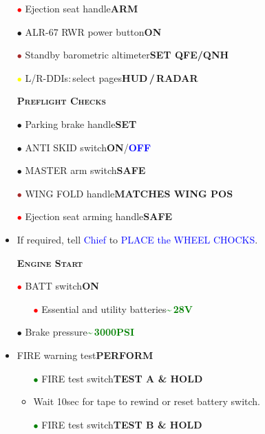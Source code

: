 \documentclass[a4paper,12pt,dvipsnames]{letter}
\newcommand{\radio}[1]{\textcolor{blue}{#1}}
\newcommand{\button}[1]{\textbf{#1}}
\newcommand{\ok}[1]{\textcolor{Green}{\textbf{#1}}}
\newcommand{\boat}[1]{\textcolor{Blue}{\textbf{#1}}}
\newcommand{\myHead}[1]{{\LARGE\textsc{\textbf{#1}}}}
\newcommand{\bi}{\textcolor{ProcessBlue}{$\bullet$\;}}
\newcommand{\ri}{\textcolor{Red}{$\bullet$\;}}
\newcommand{\gi}{\textcolor{Green}{$\bullet$\;}}
\newcommand{\yi}{\textcolor{Yellow}{$\bullet$\;}}
\newcommand{\ai}{\textcolor{Apricot}{$\bullet$\;}}
\renewcommand{\ni}{\textcolor{Brown}{$\bullet$\;}}
\begin{document}
{\begin{itemize}
 \item[\ri] Ejection seat handle\dotfill\button{ARM}
 \item[\ai] ALR-67 RWR power button\dotfill\button{ON}
 \item[\ni] Standby barometric altimeter\dotfill\button{SET QFE/QNH}
 \item[\yi] L/R-DDIs:\,select pages\dotfill\button{HUD\,/\,RADAR}
\end{itemize}
\newpage
\begin{itemize}
 \item[] \myHead{Preflight Checks}
 \item[\bi] Parking brake handle\dotfill\button{SET}
 \item[\bi] ANTI SKID switch\dotfill\button{ON}/\boat{OFF}
 \item[\bi] MASTER arm switch\dotfill\button{SAFE}
 \item[\ni] WING FOLD handle\dotfill\button{MATCHES WING POS}
 \item[\ri] Ejection seat arming handle\dotfill\button{SAFE}
 \item If required, tell \radio{Chief} to \radio{PLACE the WHEEL CHOCKS}.
\end{itemize}
\vspace{0.5em}
\begin{itemize}
 \item[] \myHead{Engine Start} 
 \item[\ri] BATT switch\dotfill\button{ON}
 \begin{itemize}
  \item[\ri] Essential and utility batteries\dotfill\ok{\textasciitilde\,28\;V}
 \end{itemize}
 \item[\bi] Brake pressure\dotfill\ok{\textasciitilde\,3000\;PSI}
 \item FIRE warning test\dotfill\button{PERFORM}
 \begin{itemize}
  \item[\gi] FIRE test switch\dotfill\button{TEST A \& HOLD}
  \item Wait 10\;sec for tape to rewind or reset battery switch.
  \item[\gi] FIRE test switch\dotfill\button{TEST B \& HOLD}
 \end{itemize}

\end{itemize}}
\end{document}
